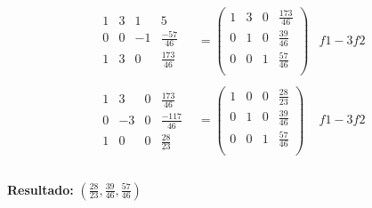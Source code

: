 \[
  \begin{aligned}
    \begin{array}{ccc|c}
        1 & 3 & 1 & 5 \\
        0 & 0 & -1 & \frac{-57}{46} \\
        \hline
        1 & 3 & 0 & \frac{173}{46}
    \end{array}
    & =
    \left(
        \begin{array}{ccc|c}
            1 & 3 & 0 & \frac{173}{46} \\
            0 & 1 & 0 & \frac{39}{46} \\
            0 & 0 & 1 & \frac{57}{46} \\
        \end{array}
    \right)
    & f1-3f2 \\ \\
    \begin{array}{ccc|c}
        1 & 3 & 0 & \frac{173}{46} \\
        0 & -3 & 0 & \frac{-117}{46} \\
        \hline
        1 & 0 & 0 & \frac{28}{23}
    \end{array}
    & =
    \left(
        \begin{array}{ccc|c}
            1 & 0 & 0 & \frac{28}{23} \\
            0 & 1 & 0 & \frac{39}{46} \\
            0 & 0 & 1 & \frac{57}{46} \\
        \end{array}
    \right)
    & f1-3f2 \\ \\
  \end{aligned}  
\]

\centering \textbf{Resultado:} \(\left(\frac{28}{23}, \frac{39}{46}, \frac{57}{46}\right)\)